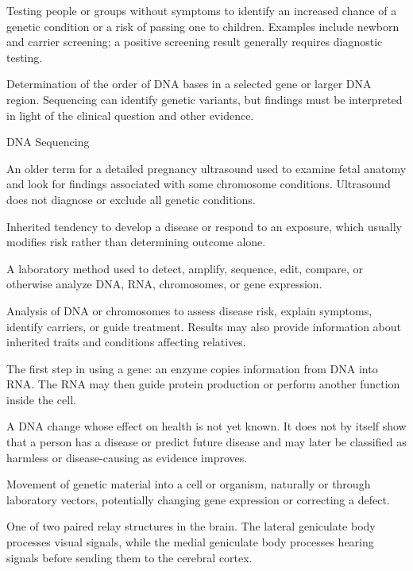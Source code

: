  Testing people or groups without symptoms to identify an increased chance of a genetic condition or a risk of passing one to children. Examples include newborn and carrier screening; a positive screening result generally requires diagnostic testing.

 Determination of the order of DNA bases in a selected gene or larger DNA region. Sequencing can identify genetic variants, but findings must be interpreted in light of the clinical question and other evidence.

\synonyms
DNA Sequencing

 An older term for a detailed pregnancy ultrasound used to examine fetal anatomy and look for findings associated with some chromosome conditions. Ultrasound does not diagnose or exclude all genetic conditions.

 Inherited tendency to develop a disease or respond to an exposure, which usually modifies risk rather than determining outcome alone.

 A laboratory method used to detect, amplify, sequence, edit, compare, or otherwise analyze DNA, RNA, chromosomes, or gene expression.

 Analysis of DNA or chromosomes to assess disease risk, explain symptoms, identify carriers, or guide treatment. Results may also provide information about inherited traits and conditions affecting relatives.

 The first step in using a gene: an enzyme copies information from DNA into RNA. The RNA may then guide protein production or perform another function inside the cell.

 A DNA change whose effect on health is not yet known. It does not by itself show that a person has a disease or predict future disease and may later be classified as harmless or disease-causing as evidence improves.

 Movement of genetic material into a cell or organism, naturally or through laboratory vectors, potentially changing gene expression or correcting a defect.

 One of two paired relay structures in the brain. The lateral geniculate body processes visual signals, while the medial geniculate body processes hearing signals before sending them to the cerebral cortex.


